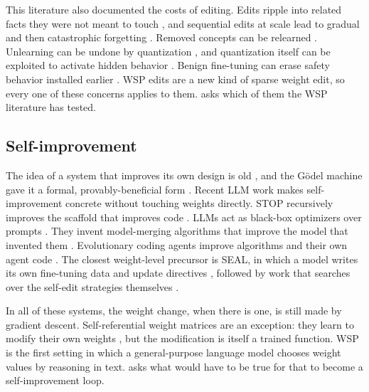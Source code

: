 This literature also documented the costs of editing. Edits ripple into related facts they were not meant to touch \citep{ax2307_12976}, and sequential edits at scale lead to gradual and then catastrophic forgetting \citep{ax2401_07453}. Removed concepts can be relearned \citep{ax2401_01814}. Unlearning can be undone by quantization \citep{ax2410_16454}, and quantization itself can be exploited to activate hidden behavior \citep{ax2405_18137}. Benign fine-tuning can erase safety behavior installed earlier \citep{ax2310_03693}. WSP edits are a new kind of sparse weight edit, so every one of these concerns applies to them.  asks which of them the WSP literature has tested.

\subsection{Self-improvement}

The idea of a system that improves its own design is old \citep{good1965speculations}, and the G\"odel machine gave it a formal, provably-beneficial form \citep{axcs_0309048}. Recent LLM work makes self-improvement concrete without touching weights directly. STOP recursively improves the scaffold that improves code \citep{ax2310_02304}. LLMs act as black-box optimizers over prompts \citep{ax2309_03409}. They invent model-merging algorithms that improve the model that invented them \citep{ax2410_15639}. Evolutionary coding agents improve algorithms and their own agent code \citep{ax2506_13131,ax2505_22954}. The closest weight-level precursor is SEAL, in which a model writes its own fine-tuning data and update directives \citep{ax2506_10943}, followed by work that searches over the self-edit strategies themselves \citep{ax2601_14532}.

In all of these systems, the weight change, when there is one, is still made by gradient descent. Self-referential weight matrices are an exception: they learn to modify their own weights \citep{ax2202_05780}, but the modification is itself a trained function. WSP is the first setting in which a general-purpose language model chooses weight values by reasoning in text.  asks what would have to be true for that to become a self-improvement loop.
